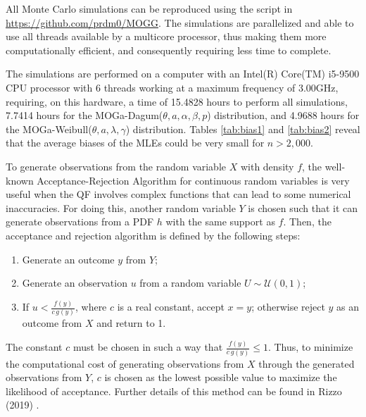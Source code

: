 \documentclass[twoside,leqno,11pt]{article}
\begin{document}
All Monte Carlo simulations can be reproduced using the script 
in \url{https://github.com/prdm0/MOGG}. The simulations are parallelized and able to use all threads available by a multicore processor, thus making them more computa\-tio\-nally efficient, 
and consequently requiring less time to complete. 

The simulations are performed on a computer with an Intel(R) Core(TM) i5-9500 CPU processor with 6 threads working at a maximum frequency of 3.00GHz, requiring, on this hardware, a time of 15.4828 hours to perform all simulations, 7.7414 hours for the MOGa-Dagum($\theta, a, \alpha, \beta, p$) distribution, 
and 4.9688 hours for the MOGa-Weibull($\theta, a, \lambda, \gamma$) distribution. Tables \ref{tab:bias1} and  \ref{tab:bias2} 
reveal that the average biases of the MLEs could be very small for $n>2,000$.

To generate observations from the random variable $X$ with density $f$, the well-known Acceptance-Rejection Algorithm for 
continuous random variables is very useful when the QF involves complex functions that can lead to some numerical inaccuracies. For doing this, another random variable $Y$ is chosen such that it can generate observations from a PDF $h$ with the same support as $f$. Then, the acceptance and rejection algorithm is defined by the following steps:
\begin{enumerate}
	\item Generate an outcome $y$ from $Y$;
	\item Generate an observation $u$ from a random variable $U\sim \mathcal{U}(0,1)$;
	\item If $u < \frac{f(y)}{c\, g(y)}$, where $c$ is a real constant, accept $x=y$; otherwise reject $y$ as an outcome from $X$ and return to 1.
\end{enumerate}

The constant $c$ must be chosen in such a way that $\frac{f(y)}{c \,g (y)}\leq 1 $. Thus, to minimize the computational cost of generating observations from $X$ through the generated observations from $Y$, $c$ is chosen as the lowest possible value to maximize the likelihood of acceptance. Further details of this method can be found in Rizzo (2019) \cite{Rizzo}.
\end{document}
